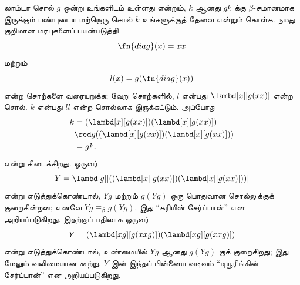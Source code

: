 \documentclass[../../../include/open-logic-section]{subfiles}
\begin{document}

லாம்டா சொல் $g$ ஒன்று உங்களிடம் உள்ளது என்றும், $k$ ஆனது $gk$ க்கு
$\beta$-சமானமாக இருக்கும் பண்புடைய மற்றொரு சொல் $k$ உங்களுக்குத் தேவை என்றும்
கொள்க. நமது குறிமான மரபுகளைப் பயன்படுத்தி
\[
\fn{diag}(x) = xx
\]
மற்றும்
\[
l(x) = g(\fn{diag}(x))
\]
என்ற சொற்களை வரையறுக்க; வேறு சொற்களில், $l$ என்பது
$\lambd[x][g(xx)]$ என்ற சொல். $k$ என்பது $ll$ என்ற சொல்லாக இருக்கட்டும்.
அப்போது
\begin{align*}
k & = (\lambd[x][g(xx)])(\lambd[x][g(xx)]) \\
& \red  g((\lambd[x][g(xx)])(\lambd[x][g(xx)])) \\
& = gk.
\end{align*}
என்று கிடைக்கிறது. ஒருவர்
\[
Y = \lambd[g][((\lambd[x][g(xx)])(\lambd[x][g(xx)]))]
\]
என்று எடுத்துக்கொண்டால், $Yg$ மற்றும் $g(Yg)$ ஒரு பொதுவான சொல்லுக்குக்
குறைகின்றன; எனவே $Yg \equiv_\beta g(Yg)$. இது ``கரியின் சேர்ப்பான்'' என
அறியப்படுகிறது. இதற்குப் பதிலாக ஒருவர்
\[
Y = (\lambd[xg][g(xxg)])(\lambd[xg][g(xxg)])
\]
என்று எடுத்துக்கொண்டால், உண்மையில் $Yg$ ஆனது $g(Yg)$ குக் குறைகிறது; இது
மேலும் வலிமையான கூற்று. $Y$ இன் இந்தப் பின்னைய வடிவம் ``டியூரிங்கின்
சேர்ப்பான்'' என அறியப்படுகிறது.
\end{document}
